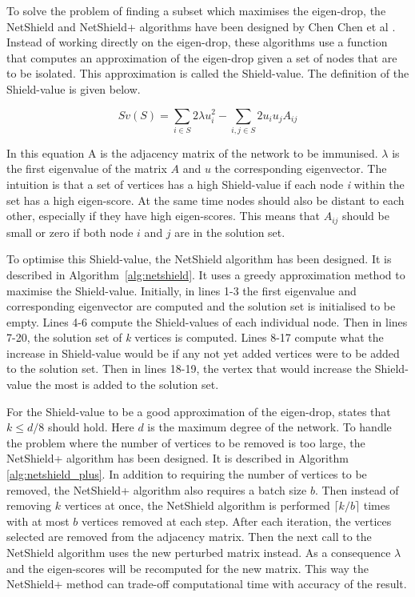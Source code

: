 \documentclass[11pt]{article}
\theoremstyle{definition}
\begin{document}
To solve the problem of finding a subset which maximises the eigen-drop, the NetShield and NetShield+ algorithms have been designed by Chen Chen et al \cite{chen2016node}. Instead of working directly on the eigen-drop, these algorithms use a function that computes an approximation of the eigen-drop given a set of nodes that are to be isolated. This approximation is called the Shield-value. The definition of the Shield-value is given below.

\begin{equation}
    Sv(S) = \sum_{i \in S} 2 \lambda u_{i}^{2} - \sum_{i,j \in S} 2 u_{i}u_{j}A_{ij}
\end{equation}

In this equation A is the adjacency matrix of the network to be immunised. $\lambda$ is the first eigenvalue of the matrix $A$ and $u$ the corresponding eigenvector. The intuition is that a set of vertices has a high Shield-value if each node \textit{i} within the set has a high eigen-score. At the same time nodes should also be distant to each other, especially if they have high eigen-scores. This means that $A_{ij}$ should be small or zero if both node $i$ and $j$ are in the solution set.

To optimise this Shield-value, the NetShield algorithm has been designed. It is described in Algorithm~\ref{alg:netshield}. It uses a greedy approximation method to maximise the Shield-value. Initially, in lines 1-3 the first eigenvalue and corresponding eigenvector are computed and the solution set is initialised to be empty. Lines 4-6 compute the Shield-values of each individual node. Then in lines 7-20, the solution set of \textit{k} vertices is computed. Lines 8-17 compute what the increase in Shield-value would be if any not yet added vertices were to be added to the solution set. Then in lines 18-19, the vertex that would increase the Shield-value the most is added to the solution set.

For the Shield-value to be a good approximation of the eigen-drop, \cite{chen2016node} states that $k \leq d/8$ should hold. Here $d$ is the maximum degree of the network. To handle the problem where the number of vertices to be removed is too large, the NetShield+ algorithm has been designed. It is described in Algorithm \ref{alg:netshield_plus}. In addition to requiring the number of vertices to be removed, the NetShield+ algorithm also requires a batch size $b$. Then instead of removing $k$ vertices at once, the NetShield algorithm is performed $\lceil k/b \rceil$ times with at most $b$ vertices removed at each step. After each iteration, the vertices selected are removed from the adjacency matrix. Then the next call to the NetShield algorithm uses the new perturbed matrix instead. As a consequence $\lambda$ and the eigen-scores will be recomputed for the new matrix. This way the NetShield+ method can trade-off computational time with accuracy of the result.
\end{document}
